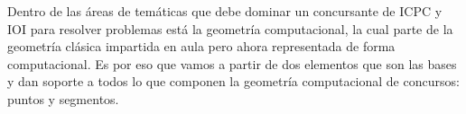 Dentro de las áreas de temáticas que debe dominar un concursante de ICPC y IOI para resolver problemas está la geometría computacional, la cual parte de la geometría clásica impartida en aula pero ahora representada de forma computacional. Es por eso que vamos a partir de dos elementos que son las bases y dan soporte a todos lo que componen la geometría computacional de concursos: puntos y segmentos.